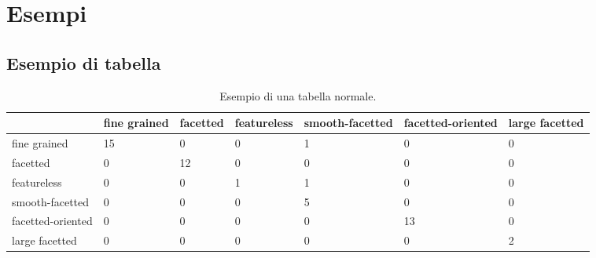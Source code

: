 \section{Esempi}

\subsection{Esempio di tabella}


\begin{table}
    \centering
    \begin{tabular}{| m{1.8cm} ||m{1.8cm}|m{1.8cm}|m{1.8cm}|m{1.8cm}|m{1.8cm}|m{1.8cm}|}
    \hline
         &  fine grained & facetted & featureless & smooth-facetted & facetted-oriented & large facetted\\
    \hline\hline
        fine grained      & 15 & 0 & 0 & 1 & 0 & 0\\
        \hline
        facetted          & 0  & 12 & 0 & 0 & 0 & 0 \\[3ex]
        \hline
        featureless       & 0 & 0 & 1 & 1 & 0  & 0\\[3ex]
        \hline
        smooth-facetted   & 0 & 0 & 0 & 5 & 0 & 0 \\
        \hline
        facetted-oriented & 0 & 0 & 0 & 0 & 13 & 0\\
        \hline
        large facetted    & 0 & 0 & 0 & 0 & 0  & 2\\
        \hline
         
    \end{tabular}
    \caption{Esempio di una tabella normale.}
    \label{tab:riferimento a tabella}
\end{table}

